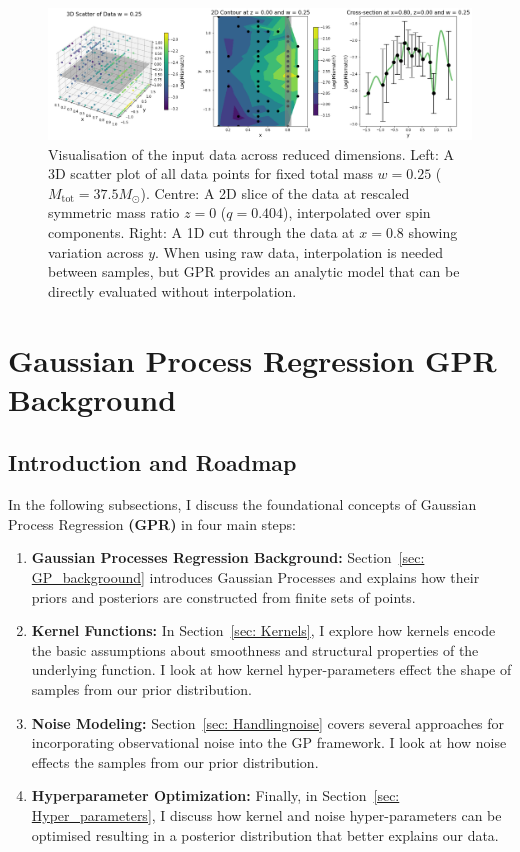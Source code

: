 \documentclass[10pt]{article}
\begin{document}
    \begin{figure}[H]
        \centering
        \includegraphics[width=\textwidth]{LatexPlots/final_gps_plots/data_visual.png}
        \caption{
        Visualisation of the input data across reduced dimensions. 
        Left: A 3D scatter plot of all data points for fixed total mass \(w = 0.25\) ($M_\text{tot}=37.5 M_\odot$). 
        Centre: A 2D slice of the data at rescaled symmetric mass ratio \(z = 0\) ($q=0.404$), interpolated over spin components.
        Right: A 1D cut through the data at \(x = 0.8\) showing variation across \(y\). 
        When using raw data, interpolation is needed between samples, but GPR provides an analytic model that can be directly evaluated without interpolation.
        }
        \label{fig:visualising_data}
    \end{figure}








\section{Gaussian Process Regression \textbf{GPR} Background}
\subsection{Introduction and Roadmap}

In the following subsections, I discuss the foundational concepts of Gaussian Process Regression \textbf{(GPR)} in four main steps:
\begin{enumerate}
    \item \textbf{Gaussian Processes Regression Background:} Section~\ref{sec: GP_backgroound} introduces Gaussian Processes and explains how their priors and posteriors are constructed from finite sets of points.
    \item \textbf{Kernel Functions:} In Section~\ref{sec: Kernels}, I explore how kernels encode the basic assumptions about smoothness and structural properties of the underlying function. I look at how kernel hyper-parameters effect the shape of samples from our prior distribution.
    \item \textbf{Noise Modeling:} Section~\ref{sec: Handlingnoise} covers several approaches for incorporating observational noise into the GP framework. I look at how noise effects the samples from our prior distribution.
    \item \textbf{Hyperparameter Optimization:} Finally, in Section~\ref{sec: Hyper_parameters}, I discuss how kernel and noise hyper-parameters can be optimised resulting in a posterior distribution that better explains our data.
\end{enumerate}
\end{document}
